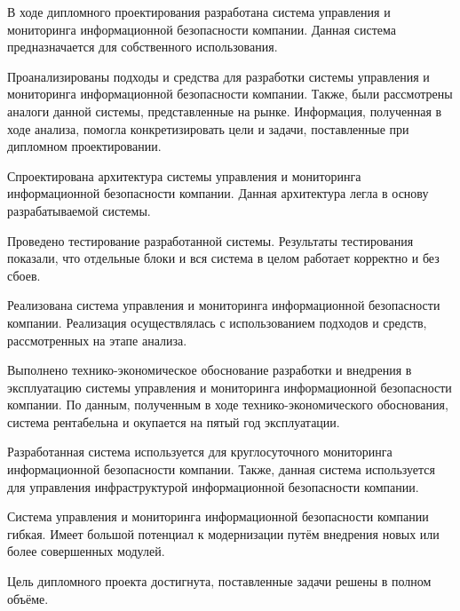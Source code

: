 
В ходе дипломного проектирования разработана система управления и мониторинга информационной безопасности компании. Данная система предназначается для собственного использования. 

Проанализированы подходы и средства для разработки системы управления и мониторинга информационной безопасности компании. Также, были рассмотрены аналоги данной системы, представленные на рынке. Информация, полученная в ходе анализа, помогла конкретизировать цели и задачи, поставленные при дипломном проектировании.

Спроектирована архитектура системы управления и мониторинга информационной безопасности компании. Данная архитектура легла в основу разрабатываемой системы.

Проведено тестирование разработанной системы. Результаты тестирования показали, что отдельные блоки и вся система в целом работает корректно и без сбоев.

Реализована система управления и мониторинга информационной безопасности компании. Реализация осуществлялась с использованием подходов и средств, рассмотренных на этапе анализа.

Выполнено технико-экономическое обоснование разработки и внедрения в эксплуатацию системы управления и мониторинга информационной безопасности компании. По данным, полученным в ходе технико-экономического обоснования, система рентабельна и окупается на пятый год эксплуатации.

Разработанная система используется для круглосуточного мониторинга информационной безопасности компании. Также, данная система используется для управления инфраструктурой информационной безопасности компании.

Система управления и мониторинга информационной безопасности компании гибкая. Имеет большой потенциал к модернизации путём внедрения новых или более совершенных модулей. 

Цель дипломного проекта достигнута, поставленные задачи решены в полном объёме.